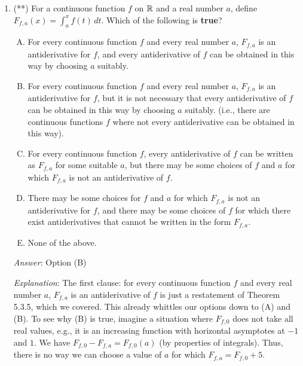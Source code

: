 \documentclass[10pt]{amsart}
\begin{document}
\begin{enumerate}
  {\em Performance review}: $1$ out of $11$ got this correct. $4$ each
  chose (B) and (E), $2$ chose (D).

  {\em Historical note (last year)}: $8$ out of $15$ people got this
  correct. $5$ people chose (B) and $2$ people chose (D).

  {\em Action point}: We'll review this in class next time.

\item (**) For a continuous function $f$ on $\mathbb{R}$ and a real number
  $a$, define $F_{f,a}(x) = \int_a^x f(t) \, dt$. Which of the
  following is {\bf true}?

  \begin{enumerate}[(A)]
  \item For every continuous function $f$ and every real number $a$,
    $F_{f,a}$ is an antiderivative for $f$, and every antiderivative
    of $f$ can be obtained in this way by choosing $a$ suitably.
  \item For every continuous function $f$ and every real number $a$,
    $F_{f,a}$ is an antiderivative for $f$, but it is not necessary
    that every antiderivative of $f$ can be obtained in this way by
    choosing $a$ suitably. (i.e., there are continuous functions $f$
    where not every antiderivative can be obtained in this way).
  \item For every continuous function $f$, every antiderivative of $f$
    can be written as $F_{f,a}$ for some suitable $a$, but there may
    be some choices of $f$ and $a$ for which $F_{f,a}$ is not an
    antiderivative of $f$.
  \item There may be some choices for $f$ and $a$ for which $F_{f,a}$
    is not an antiderivative for $f$, and there may be some choices of
    $f$ for which there exist antiderivatives that cannot be written
    in the form $F_{f,a}$.
  \item None of the above.
  \end{enumerate}

  {\em Answer}: Option (B)

  {\em Explanation}: The first clause: for every continuous function
  $f$ and every real number $a$, $F_{f,a}$ is an antiderivative of $f$
  is just a restatement of Theorem 5.3.5, which we covered. This
  already whittles our options down to (A) and (B). To see why (B) is
  true, imagine a situation where $F_{f,0}$ does not take all real
  values, e.g., it is an increasing function with horizontal
  asymptotes at $-1$ and $1$. We have $F_{f,0} - F_{f,a} = F_{f,0}(a)$
  (by properties of integrals). Thus, there is no way we can choose a
  value of $a$ for which $F_{f,a} = F_{f,0} + 5$.


\end{enumerate}
\end{document}
